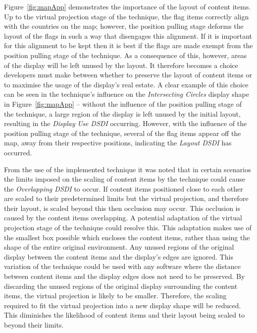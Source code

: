 \documentclass[twocolumn,compsoc]{cvm}
\begin{document}
{Figure~\ref{fig:mapApp} demonstrates the importance of the layout of content items.
Up to the virtual projection stage of the technique, the flag items correctly align with the countries on the map; however, the position pulling stage deforms the layout of the flags in such a way that disengages this alignment.
If it is important for this alignment to be kept then it is best if the flags are made exempt from the position pulling stage of the technique.
As a consequence of this, however, areas of the display will be left unused by the layout.
It therefore becomes a choice developers must make between whether to preserve the layout of content items or to maximise the usage of the display's real estate.
A clear example of this choice can be seen in the technique's influence on the {\emph{Intersecting Circles}} display shape in Figure~\ref{fig:mapApp} -- without the influence of the position pulling stage of the technique, a large region of the display is left unused by the initial layout, resulting in the {\emph{Display Use \ac{DSDI}}} occurring.
However, with the influence of the position pulling stage of the technique, several of the flag items appear off the map, away from their respective positions, indicating the {\emph{Layout \ac{DSDI}}} has occurred.

From the use of the implemented technique it was noted that in certain scenarios the limits imposed on the scaling of content items by the technique could cause the {\emph{Overlapping \ac{DSDI}}} to occur.
If content items positioned close to each other are scaled to their predetermined limits but the virtual projection, and therefore their layout, is scaled beyond this then occlusion may occur.
This occlusion is caused by the content items overlapping.
A potential adaptation of the virtual projection stage of the technique could resolve this.  
This adaptation makes use of the smallest box possible which encloses the content items, rather than using the shape of the entire original environment.
Any unused regions of the original display between the content items and the display's edges are ignored.
This variation of the technique could be used with any software where the distance between content items and the display edges does not need to be preserved.
By discarding the unused regions of the original display surrounding the content items, the virtual projection is likely to be smaller.
Therefore, the scaling required to fit the virtual projection into a new display shape will be reduced.
This diminishes the likelihood of content items and their layout being scaled to beyond their limits. 

}
\end{document}
